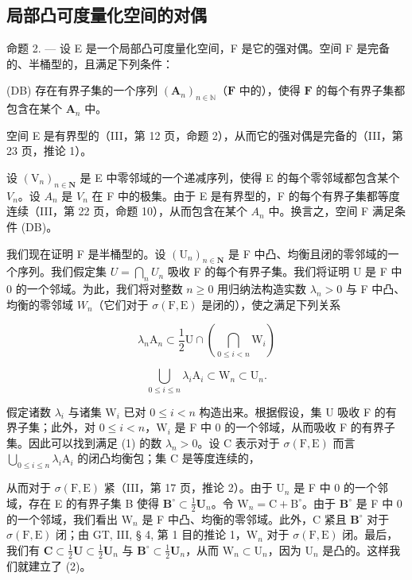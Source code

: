 \subsection{局部凸可度量化空间的对偶}

命题 2. --- 设 E 是一个局部凸可度量化空间，F 是它的强对偶。空间 F 是完备的、半桶型的，且满足下列条件：

(DB) 存在有界子集的一个序列 \((\mathbf{A}_n)_{n\in \mathbb{N}}\)（\(\mathbf{F}\) 中的），使得 \(\mathbf{F}\) 的每个有界子集都包含在某个 \(\mathbf{A}_n\) 中。

空间 E 是有界型的（III，第 12 页，命题 2），从而它的强对偶是完备的（III，第 23 页，推论 1）。

设 \((\mathrm{V}_{n})_{n\in\mathbf{N}}\) 是 E 中零邻域的一个递减序列，使得 E 的每个零邻域都包含某个 \(V_{n}\)。设 \(A_{n}\) 是 \(V_{n}\) 在 F 中的极集。由于 E 是有界型的，F 的每个有界子集都等度连续（III，第 22 页，命题 10），从而包含在某个 \(A_{n}\) 中。换言之，空间 F 满足条件 (DB)。

我们现在证明 F 是半桶型的。设 \((\mathrm{U}_{n})_{n\in\mathbf{N}}\) 是 F 中凸、均衡且闭的零邻域的一个序列。我们假定集 \(U=\bigcap_{n}U_{n}\) 吸收 F 的每个有界子集。我们将证明 U 是 F 中 0 的一个邻域。为此，我们将对整数 \(n\geqslant0\) 用归纳法构造实数 \(\lambda_{n}>0\) 与 F 中凸、均衡的零邻域 \(W_{n}\)（它们对于 \(\sigma(\mathrm{F},\mathrm{E})\) 是闭的），使之满足下列关系

\[
\lambda_ {n} \mathrm{A} _ {n} \subset \frac {1}{2} \mathrm{U} \cap \left(\bigcap_ {0 \leqslant i <   n} \mathrm{W} _ {i}\right)\tag{1}
\]

\[
\bigcup_ {0 \leqslant i \leqslant n} \lambda_ {i} \mathrm{A} _ {i} \subset \mathrm{W} _ {n} \subset \mathrm{U} _ {n}.\tag{2}
\]

假定诸数 \(\lambda_{i}\) 与诸集 \(\mathrm{W}_i\) 已对 \(0 \leqslant i < n\) 构造出来。根据假设，集 U 吸收 F 的有界子集；此外，对 \(0 \leqslant i < n\)，\(\mathrm{W}_i\) 是 F 中 0 的一个邻域，从而吸收 F 的有界子集。因此可以找到满足 (1) 的数 \(\lambda_{n} > 0\)。设 C 表示对于 \(\sigma(\mathrm{F}, \mathrm{E})\) 而言 \(\bigcup_{0 \leqslant i \leqslant n} \lambda_i \mathrm{A}_i\) 的闭凸均衡包；集 C 是等度连续的，

从而对于 \(\sigma(\mathrm{F},\mathrm{E})\) 紧（III，第 17 页，推论 2）。由于 \(\mathrm{U}_n\) 是 F 中 0 的一个邻域，存在 E 的有界子集 B 使得 \(\mathbf{B}^{\circ}\subset\frac{1}{2}\mathbf{U}_{n}\)。令 \(\mathrm{W}_n=\mathrm{C}+\mathrm{B}^{\circ}\)。由于 \(\mathbf{B}^{\circ}\) 是 F 中 0 的一个邻域，我们看出 \(\mathrm{W}_n\) 是 F 中凸、均衡的零邻域。此外，C 紧且 \(\mathbf{B}^{\circ}\) 对于 \(\sigma(\mathrm{F},\mathrm{E})\) 闭；由 GT, III, § 4, 第 1 目的推论 1，\(\mathrm{W}_n\) 对于 \(\sigma(\mathrm{F},\mathrm{E})\) 闭。最后，我们有 \(\mathbf{C}\subset\frac{1}{2}\mathbf{U}\subset\frac{1}{2}\mathbf{U}_n\) 与 \(\mathbf{B}^{\circ}\subset\frac{1}{2}\mathbf{U}_n\)，从而 \(\mathrm{W}_n\subset\mathrm{U}_n\)，因为 \(\mathrm{U}_n\) 是凸的。这样我们就建立了 (2)。

